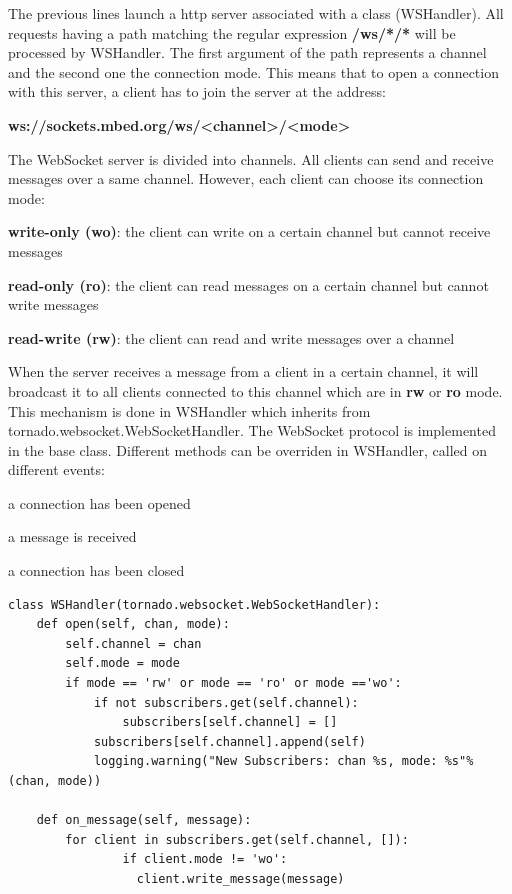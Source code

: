 \documentclass[pdftex,10pt,a4paper]{report}
\newenvironment{packed_item}{
\begin{itemize}
  \setlength{\itemsep}{1pt}
  \setlength{\parskip}{0pt}
  \setlength{\parsep}{0pt}
}{\end{itemize}}
\begin{document}
The previous lines launch a http server associated with a class (WSHandler). All requests having a path matching the regular expression \textbf{/ws/*/*} will be processed by WSHandler. The first argument of the path represents a channel and the second one the connection mode. This means that to open a connection with this server, a client has to join the server at the address: 
\begin{center}
\textbf{ws://sockets.mbed.org/ws/\textless{}channel\textgreater{}/\textless{}mode\textgreater{}}
\end{center}

The WebSocket server is divided into channels. All clients can send and receive messages over a same channel. However, each client can choose its connection mode:

\begin{packed_item}
	\item \textbf{write-only (wo)}: the client can write on a certain channel but cannot receive messages
	\item \textbf{read-only (ro)}: the client can read messages on a certain channel but cannot write messages
	\item \textbf{read-write (rw)}: the client can read and write messages over a channel
\end{packed_item}

When the server receives a message from a client in a certain channel, it will broadcast it to all clients connected to this channel which are in \textbf{rw} or \textbf{ro} mode. This mechanism is done in WSHandler which inherits from tornado.websocket.WebSocketHandler. The WebSocket protocol is implemented in the base class. Different methods can be overriden in WSHandler, called on different events:

\begin{packed_item}
	\item a connection has been opened
	\item a message is received
	\item a connection has been closed
\end{packed_item}

\begin{lstlisting}[label=Broadcast messages received,caption=Broadcast messages received]
class WSHandler(tornado.websocket.WebSocketHandler):
    def open(self, chan, mode):
        self.channel = chan
        self.mode = mode
        if mode == 'rw' or mode == 'ro' or mode =='wo':
            if not subscribers.get(self.channel):
                subscribers[self.channel] = []
            subscribers[self.channel].append(self)	
            logging.warning("New Subscribers: chan %s, mode: %s"%(chan, mode))

    def on_message(self, message):
        for client in subscribers.get(self.channel, []):
        		if client.mode != 'wo':
	              client.write_message(message)
\end{lstlisting}
\end{document}
